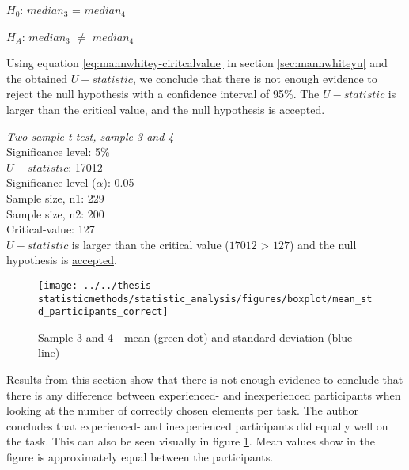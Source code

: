\centerline{$H_{0}$: $median_3$ = $median_4$}
\centerline{$H_{A}$: $median_3$ $\neq$ $median_4$}

Using equation \ref{eq:mannwhitey-ciritcalvalue} in section \ref{sec:mannwhiteyu} and the obtained $U-statistic$, we conclude that there is not enough evidence to reject the null hypothesis with a confidence interval of 95\%. The $U-statistic$ is larger than the critical value, and the null hypothesis is accepted. 

 \begin{center}
	\begin{tcolorbox}[width=0.8\textwidth]
		\centering
		\textit{Two sample t-test, sample 3 and 4}\\
		Significance level: 5\%  \\[0.5cm]
		
		$U-statistic$: 17012 \\
		Significance level ($\alpha$): 0.05 \\
		Sample size, n1:  229\\
		Sample size, n2: 200\\
		Critical-value: 127 \\[0.2cm] %
		
		$U-statistic$ is larger than the critical value ($17012$ > $127$) and the null hypothesis is \underline{accepted}.\\[0.5cm]
	\end{tcolorbox} 
\end{center}

\begin{figure}[H]
	\centering
	\texttt{[image: ../../thesis-statisticmethods/statistic\_analysis/figures/boxplot/mean\_std\_participants\_correct]}
	\caption{Sample 3 and 4 - mean (green dot) and standard deviation (blue line)}
	\label{fig:meanstdparticipantscorrect}
\end{figure}

Results from this section show that there is not enough evidence to conclude that there is any difference between experienced- and inexperienced participants when looking at the number of correctly chosen elements per task. The author concludes that experienced- and inexperienced participants did equally well on the task. This can also be seen visually in figure \ref{fig:meanstdparticipantscorrect}. Mean values show in the figure is approximately equal between the participants. 

